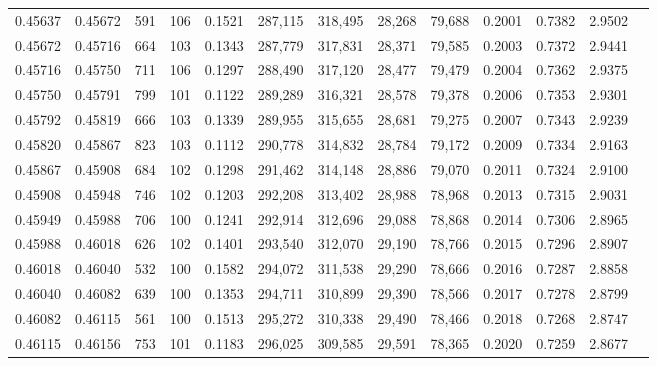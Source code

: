 \begin{tabular}{rrrrrrrrrrrrr}
0.45637 & 0.45672 &   591 & 106 &                                     0.1521 & 287,115 & 318,495 &  28,268 &  79,688 & 0.2001 & 0.7382 & 2.9502 \\
0.45672 & 0.45716 &   664 & 103 &                                     0.1343 & 287,779 & 317,831 &  28,371 &  79,585 & 0.2003 & 0.7372 & 2.9441 \\
0.45716 & 0.45750 &   711 & 106 &                                     0.1297 & 288,490 & 317,120 &  28,477 &  79,479 & 0.2004 & 0.7362 & 2.9375 \\
0.45750 & 0.45791 &   799 & 101 &                                     0.1122 & 289,289 & 316,321 &  28,578 &  79,378 & 0.2006 & 0.7353 & 2.9301 \\
0.45792 & 0.45819 &   666 & 103 &                                     0.1339 & 289,955 & 315,655 &  28,681 &  79,275 & 0.2007 & 0.7343 & 2.9239 \\
0.45820 & 0.45867 &   823 & 103 &                                     0.1112 & 290,778 & 314,832 &  28,784 &  79,172 & 0.2009 & 0.7334 & 2.9163 \\
0.45867 & 0.45908 &   684 & 102 &                                     0.1298 & 291,462 & 314,148 &  28,886 &  79,070 & 0.2011 & 0.7324 & 2.9100 \\
0.45908 & 0.45948 &   746 & 102 &                                     0.1203 & 292,208 & 313,402 &  28,988 &  78,968 & 0.2013 & 0.7315 & 2.9031 \\
0.45949 & 0.45988 &   706 & 100 &                                     0.1241 & 292,914 & 312,696 &  29,088 &  78,868 & 0.2014 & 0.7306 & 2.8965 \\
0.45988 & 0.46018 &   626 & 102 &                                     0.1401 & 293,540 & 312,070 &  29,190 &  78,766 & 0.2015 & 0.7296 & 2.8907 \\
0.46018 & 0.46040 &   532 & 100 &                                     0.1582 & 294,072 & 311,538 &  29,290 &  78,666 & 0.2016 & 0.7287 & 2.8858 \\
0.46040 & 0.46082 &   639 & 100 &                                     0.1353 & 294,711 & 310,899 &  29,390 &  78,566 & 0.2017 & 0.7278 & 2.8799 \\
0.46082 & 0.46115 &   561 & 100 &                                     0.1513 & 295,272 & 310,338 &  29,490 &  78,466 & 0.2018 & 0.7268 & 2.8747 \\
0.46115 & 0.46156 &   753 & 101 &                                     0.1183 & 296,025 & 309,585 &  29,591 &  78,365 & 0.2020 & 0.7259 & 2.8677 \\

\end{tabular}
